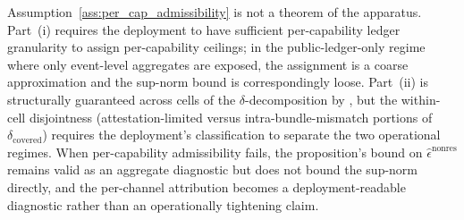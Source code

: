 \begin{remark}
\label{rem:per_cap_admissibility_deployment}
Assumption~\ref{ass:per_cap_admissibility} is not a theorem of
the apparatus.  Part~(i) requires the deployment to have
sufficient per-capability ledger granularity to assign
per-capability ceilings; in the public-ledger-only regime where
only event-level aggregates are exposed, the assignment is a
coarse approximation and the sup-norm bound is correspondingly
loose.  Part~(ii) is structurally guaranteed across cells of the
$\delta$-decomposition by
\citep[Definition~8]{lasser2026paper8b}, but the within-cell
disjointness (attestation-limited versus intra-bundle-mismatch
portions of $\delta_{\mathrm{covered}}$) requires the
deployment's classification to separate the two operational
regimes.  When per-capability admissibility fails, the
proposition's bound on $\hat{\epsilon}^{\mathrm{nonres}}$ remains
valid as an aggregate diagnostic but does not bound the sup-norm
directly, and the per-channel attribution becomes a
deployment-readable diagnostic rather than an operationally
tightening claim.
\end{remark}

